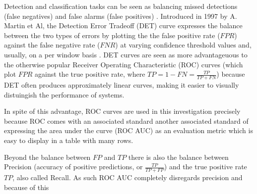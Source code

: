 Detection and classification tasks can be seen as balancing missed detections (false negatives) and false alarms (false positives) \cite{martin1997det}. Introduced in 1997 by A. Martin et Al, the Detection Error Tradeoff (DET) curve expresses the balance between the two types of errors by plotting the the false positive rate ($FPR$) against the false negative rate ($FNR$) at varying confidence threshold values \cite{martin1997det} and, usually, on a per window basis \cite{dalal_2005_histograms} \cite{dollar_2012_pedestrian}. DET curves are seen as more advantageuous to the otherwise popular Receiver Operating Characteristic (ROC) curves (which plot $FPR$ against the true positive rate, where $TP=1-FN=\frac{TP}{TP+FN}$) because DET often produces approximately linear curves, making it easier to visually distuingish the performance of systems.



In spite of this advantage, ROC curves are used in this investigation precisely because ROC comes with an associated standard another associated standard of expressing the area under the curve (ROC AUC) as an evaluation metric which is easy to display in a table with many rows. 

Beyond the balance between $FP$ and $TP$ there is also the balance between Precision (accuracy of positive predictions, or $\frac{TP}{TP+FP}$) and the true positive rate $TP$, also called Recall. As such ROC AUC completely disregards precision and because of this 